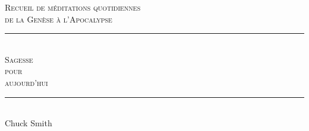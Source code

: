 
\newcommand{\HRule}{\rule{\linewidth}{0.2mm}}

\begin{titlepage}
\begin{center}
\mbox{}
\vfill
\textsc{\large Recueil de méditations quotidiennes\\de la Genèse à l'Apocalypse}
\\[1.5cm]
\HRule \\[0.4cm]
\textsc{ \Huge Sagesse\\ pour\\[0.4cm] aujourd'hui}\\[0.4cm]

\HRule \\[1.5cm]
{\LARGE Chuck Smith}\\[1.5cm]
\vfill
\mbox{}
\end{center}
\end{titlepage}

